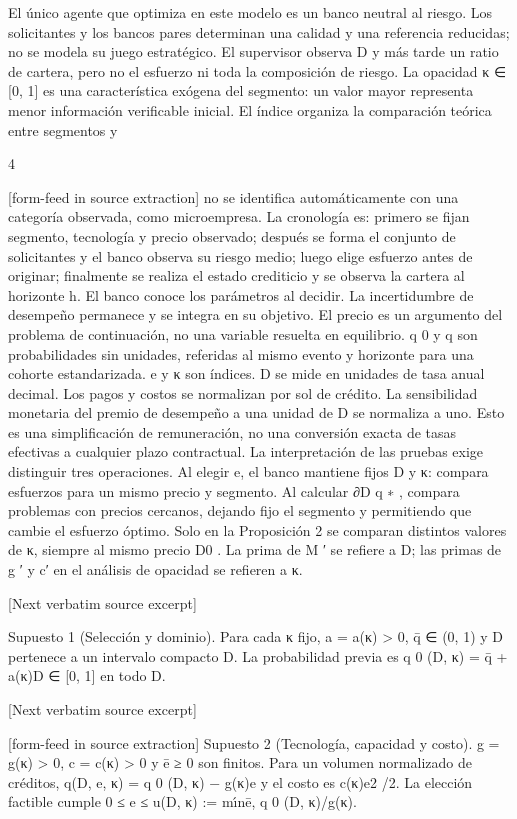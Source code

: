 \documentclass[10pt]{article}
\begin{document}
\begin{ReviewVerbatim}

El único agente que optimiza en este modelo es un banco neutral al riesgo. Los solicitantes y los
bancos pares determinan una calidad y una referencia reducidas; no se modela su juego estratégico.
El supervisor observa D y más tarde un ratio de cartera, pero no el esfuerzo ni toda la composición de
riesgo. La opacidad κ ∈ [0, 1] es una característica exógena del segmento: un valor mayor representa
menor información veriﬁcable inicial. El índice organiza la comparación teórica entre segmentos y

4


[form-feed in source extraction]
no se identiﬁca automáticamente con una categoría observada, como microempresa.
La cronología es: primero se ﬁjan segmento, tecnología y precio observado; después se forma el
conjunto de solicitantes y el banco observa su riesgo medio; luego elige esfuerzo antes de originar;
ﬁnalmente se realiza el estado crediticio y se observa la cartera al horizonte h. El banco conoce los
parámetros al decidir. La incertidumbre de desempeño permanece y se integra en su objetivo. El
precio es un argumento del problema de continuación, no una variable resuelta en equilibrio.
q 0 y q son probabilidades sin unidades, referidas al mismo evento y horizonte para una cohorte
estandarizada. e y κ son índices. D se mide en unidades de tasa anual decimal. Los pagos y costos
se normalizan por sol de crédito. La sensibilidad monetaria del premio de desempeño a una unidad
de D se normaliza a uno. Esto es una simpliﬁcación de remuneración, no una conversión exacta de
tasas efectivas a cualquier plazo contractual.
La interpretación de las pruebas exige distinguir tres operaciones. Al elegir e, el banco mantiene
ﬁjos D y κ: compara esfuerzos para un mismo precio y segmento. Al calcular ∂D q ∗ , compara
problemas con precios cercanos, dejando ﬁjo el segmento y permitiendo que cambie el esfuerzo
óptimo. Solo en la Proposición 2 se comparan distintos valores de κ, siempre al mismo precio D0 .
La prima de M ′ se reﬁere a D; las primas de g ′ y c′ en el análisis de opacidad se reﬁeren a κ.

[Next verbatim source excerpt]

Supuesto 1 (Selección y dominio). Para cada κ ﬁjo, a = a(κ) > 0, q̄ ∈ (0, 1) y D pertenece a un
intervalo compacto D. La probabilidad previa es q 0 (D, κ) = q̄ + a(κ)D ∈ [0, 1] en todo D.

[Next verbatim source excerpt]


[form-feed in source extraction]
Supuesto 2 (Tecnología, capacidad y costo). g = g(κ) > 0, c = c(κ) > 0 y ē ≥ 0 son ﬁnitos.
Para un volumen normalizado de créditos, q(D, e, κ) = q 0 (D, κ) − g(κ)e y el costo es c(κ)e2 /2. La
elección factible cumple
0 ≤ e ≤ u(D, κ) := mı́n{ē, q 0 (D, κ)/g(κ)}.


\end{ReviewVerbatim}
\end{document}
